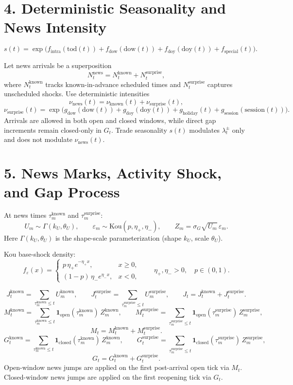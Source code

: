 \documentclass[11pt]{article}
\begin{document}
\section*{4. Deterministic Seasonality and News Intensity}
\[
s(t)=\exp\!\Big(
f_{\mathrm{intra}}(\mathrm{tod}(t))
+f_{\mathrm{dow}}(\mathrm{dow}(t))
+f_{\mathrm{doy}}(\mathrm{doy}(t))
+f_{\mathrm{special}}(t)
\Big).
\]

Let news arrivals be a superposition
\[
N_t^{\mathrm{news}} = N_t^{\mathrm{known}} + N_t^{\mathrm{surprise}},
\]
where \(N_t^{\mathrm{known}}\) tracks known-in-advance scheduled times and
\(N_t^{\mathrm{surprise}}\) captures unscheduled shocks.
Use deterministic intensities
\[
\nu_{\mathrm{news}}(t)=\nu_{\mathrm{known}}(t)+\nu_{\mathrm{surprise}}(t),
\]
\[
\nu_{\mathrm{surprise}}(t)
=
\exp\!\Big(
g_{\mathrm{dow}}(\mathrm{dow}(t))
+g_{\mathrm{doy}}(\mathrm{doy}(t))
+g_{\mathrm{holiday}}(t)
+g_{\mathrm{session}}(\mathrm{session}(t))
\Big).
\]
Arrivals are allowed in both open and closed windows, while direct gap increments remain closed-only in \(G_t\).
Trade seasonality \(s(t)\) modulates \(\lambda_t^\pm\) only and does not modulate \(\nu_{\mathrm{news}}(t)\).

\section*{5. News Marks, Activity Shock, and Gap Process}
At news times \(\tau_m^{\mathrm{known}}\) and \(\tau_m^{\mathrm{surprise}}\):
\[
U_m\sim\Gamma(k_U,\theta_U),\qquad
\varepsilon_m\sim\text{Kou}(p,\eta_+,\eta_-),\qquad
Z_m=\sigma_G\sqrt{U_m}\,\varepsilon_m.
\]
Here \(\Gamma(k_U,\theta_U)\) is the shape-scale parameterization (shape \(k_U\), scale \(\theta_U\)).

Kou base-shock density:
\[
f_{\varepsilon}(x)=
\begin{cases}
p\,\eta_+e^{-\eta_+ x}, & x\ge 0,\\
(1-p)\,\eta_-e^{\eta_- x}, & x<0,
\end{cases}
\qquad
\eta_+,\eta_->0,\quad p\in(0,1).
\]

\[
J_t^{\mathrm{known}}=\sum_{\tau_m^{\mathrm{known}}\le t} U_m^{\mathrm{known}},
\qquad
J_t^{\mathrm{surprise}}=\sum_{\tau_m^{\mathrm{surprise}}\le t} U_m^{\mathrm{surprise}},
\qquad
J_t=J_t^{\mathrm{known}}+J_t^{\mathrm{surprise}}.
\]
\[
M_t^{\mathrm{known}}=\sum_{\tau_m^{\mathrm{known}}\le t}\mathbf{1}_{\mathrm{open}}(\tau_m^{\mathrm{known}})\,Z_m^{\mathrm{known}},
\qquad
M_t^{\mathrm{surprise}}=\sum_{\tau_m^{\mathrm{surprise}}\le t}\mathbf{1}_{\mathrm{open}}(\tau_m^{\mathrm{surprise}})\,Z_m^{\mathrm{surprise}},
\]
\[
M_t=M_t^{\mathrm{known}}+M_t^{\mathrm{surprise}}.
\]
\[
G_t^{\mathrm{known}}=\sum_{\tau_m^{\mathrm{known}}\le t}\mathbf{1}_{\mathrm{closed}}(\tau_m^{\mathrm{known}})\,Z_m^{\mathrm{known}},
\qquad
G_t^{\mathrm{surprise}}=\sum_{\tau_m^{\mathrm{surprise}}\le t}\mathbf{1}_{\mathrm{closed}}(\tau_m^{\mathrm{surprise}})\,Z_m^{\mathrm{surprise}},
\]
\[
G_t=G_t^{\mathrm{known}}+G_t^{\mathrm{surprise}}.
\]
Open-window news jumps are applied on the first post-arrival open tick via \(M_t\).
Closed-window news jumps are applied on the first reopening tick via \(G_t\).
\end{document}
